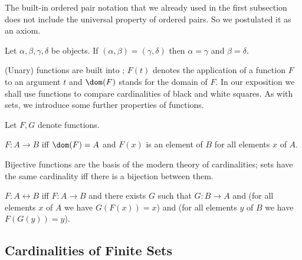 The built-in ordered pair {notation} that we already used in the first
subsection does not include the universal property of ordered pairs.
So we postulated it as an axiom.

\begin{forthel}
    \begin{axiom}
        Let $\alpha, \beta, \gamma, \delta$ be objects.
        If $(\alpha, \beta) = (\gamma, \delta)$
        then $\alpha = \gamma$ and $\beta = \delta$.
    \end{axiom}
\end{forthel}

(Unary) functions are built into \Naproche{}; $F(t)$ denotes the
application of a function $F$ to an argument $t$ and
$\dom(F)$ stands for the domain of $F$. In our exposition we shall
use functions to compare cardinalities of black and white squares. As with
sets, we introduce some further properties of functions.

\begin{forthel}
    Let $F,G$ denote functions.

    \begin{definition}
        $F : A \to B$ iff $\dom(F) = A$ and
        $F(x)$ is an element of $B$ for all elements $x$ of $A$.
    \end{definition}
\end{forthel}

Bijective functions are the basis of the modern theory of cardinalities; sets
have the same cardinality iff there is a bijection between them.

\begin{forthel}
    \begin{definition}
        $F : A \leftrightarrow B$ iff $F : A \to B$ and there exists $G$ such that
        $G : B \to A$ and
        (for all elements $x$ of $A$ we have $G(F(x)) = x$) and
        (for all elements $y$ of $B$ we have $F(G(y)) = y$).
    \end{definition}
\end{forthel}


\subsection{Cardinalities of Finite Sets}

